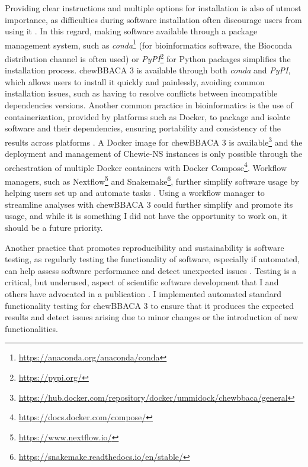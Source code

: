 Providing clear instructions and multiple options for installation is also of utmost importance, as difficulties during software installation often discourage users from using it \cite{alser_packaging_2024}. In this regard, making software available through a package management system, such as \textit{conda}\footnote{\url{https://anaconda.org/anaconda/conda}} (for bioinformatics software, the Bioconda distribution channel \cite{gruning_bioconda_2018} is often used) or \textit{PyPI}\footnote{\url{https://pypi.org/}} for Python packages simplifies the installation process. chewBBACA 3 is available through both \textit{conda} and \textit{PyPI}, which allows users to install it quickly and painlessly, avoiding common installation issues, such as having to resolve conflicts between incompatible dependencies versions. Another common practice in bioinformatics is the use of containerization, provided by platforms such as Docker, to package and isolate software and their dependencies, ensuring portability and consistency of the results across platforms \cite{gruening_recommendations_2018, nust_ten_2020, boettiger_introduction_2015, kadri_containers_2022}. A Docker image for chewBBACA 3 is available\footnote{\url{https://hub.docker.com/repository/docker/ummidock/chewbbaca/general}} and the deployment and management of \ac{Chewie-NS} instances is only possible through the orchestration of multiple Docker containers with Docker Compose\footnote{\url{https://docs.docker.com/compose/}}. Workflow managers, such as Nextflow\footnote{\url{https://www.nextflow.io/}} and Snakemake\footnote{\url{https://snakemake.readthedocs.io/en/stable/}}, further simplify software usage by helping users set up and automate tasks \cite{wratten_reproducible_2021, strozzi_scalable_2019}. Using a workflow manager to streamline analyses with chewBBACA 3 could further simplify and promote its usage, and while it is something I did not have the opportunity to work on, it should be a future priority.

Another practice that promotes reproducibility and sustainability is software testing, as regularly testing the functionality of software, especially if automated, can help assess software performance and detect unexpected issues \cite{krafczyk_scientific_2019}. Testing is a critical, but underused, aspect of scientific software development that I and others have advocated in a publication \cite{van_der_putten_software_2022}. I implemented automated standard functionality testing for chewBBACA 3 to ensure that it produces the expected results and detect issues arising due to minor changes or the introduction of new functionalities.

